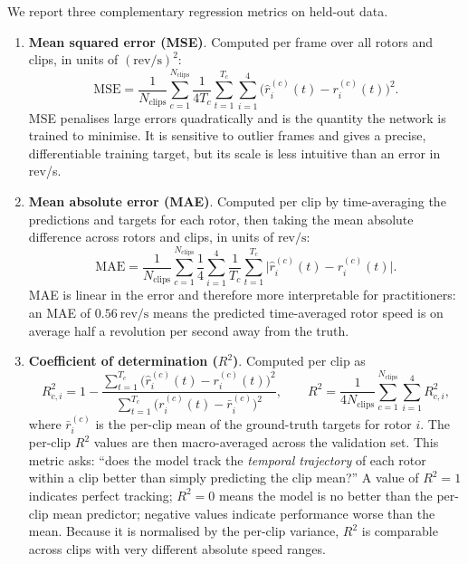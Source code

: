 \documentclass{QD_2026}
\newcommand{\revps}{\mathrm{rev}/\mathrm{s}}
\newcommand{\rsq}{R^{2}}
\begin{document}
We report three complementary regression metrics on held-out data.
\begin{enumerate}
  \item \textbf{Mean squared error (MSE)}.
    Computed per frame over all rotors and clips, in units of $(\revps)^{2}$:
    \begin{equation}
      \mathrm{MSE} = \frac{1}{N_{\text{clips}}}\sum_{c=1}^{N_{\text{clips}}}
        \frac{1}{4T_{c}}\sum_{t=1}^{T_{c}}\sum_{i=1}^{4}
        \bigl(\hat{r}_{i}^{(c)}(t) - r_{i}^{(c)}(t)\bigr)^{2}.
    \end{equation}
    MSE penalises large errors quadratically and is the quantity the network is
    trained to minimise. It is sensitive to outlier frames and gives a precise,
    differentiable training target, but its scale is less intuitive than an error
    in rev/s.

  \item \textbf{Mean absolute error (MAE)}.
    Computed per clip by time-averaging the predictions and targets for each
    rotor, then taking the mean absolute difference across rotors and clips,
    in units of $\revps$:
    \begin{equation}
      \mathrm{MAE} = \frac{1}{N_{\text{clips}}}\sum_{c=1}^{N_{\text{clips}}}
        \frac{1}{4}\sum_{i=1}^{4} \frac{1}{T_{c}}\sum_{t=1}^{T_{c}}
        \bigl|\hat{r}_{i}^{(c)}(t) - r_{i}^{(c)}(t)\bigr|.
    \end{equation}
    MAE is linear in the error and therefore more interpretable for
    practitioners: an MAE of $0.56~\revps$ means the predicted time-averaged
    rotor speed is on average half a revolution per second away from the truth.

  \item \textbf{Coefficient of determination ($\rsq$)}.
    Computed per clip as
    \begin{equation}
      R^{2}_{c,i} = 1 - \frac{\sum_{t=1}^{T_{c}}
        \bigl(\hat{r}_{i}^{(c)}(t) - r_{i}^{(c)}(t)\bigr)^{2}}
        {\sum_{t=1}^{T_{c}} \bigl(r_{i}^{(c)}(t) - \bar{r}_{i}^{(c)}\bigr)^{2}},
      \qquad
      R^{2} = \frac{1}{4N_{\text{clips}}}\sum_{c=1}^{N_{\text{clips}}}
        \sum_{i=1}^{4} R^{2}_{c,i},
    \end{equation}
    where $\bar{r}_{i}^{(c)}$ is the per-clip mean of the ground-truth targets
    for rotor $i$. The per-clip $\rsq$ values are then macro-averaged across the
    validation set. This metric asks: ``does the model track the \emph{temporal
    trajectory} of each rotor within a clip better than simply predicting the
    clip mean?'' A value of $\rsq = 1$ indicates perfect tracking; $\rsq = 0$
    means the model is no better than the per-clip mean predictor; negative
    values indicate performance worse than the mean. Because it is normalised
    by the per-clip variance, $\rsq$ is comparable across clips with very
    different absolute speed ranges.
\end{enumerate}
\end{document}
